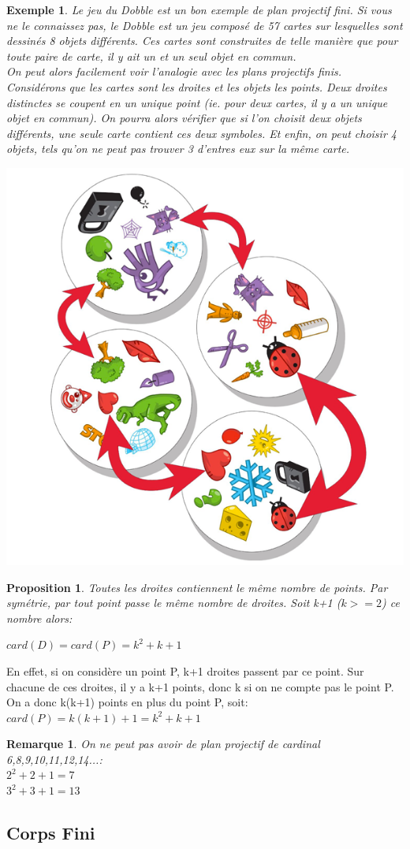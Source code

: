 \documentclass[a4paper]{article}
\newtheorem{Rem}{Remarque}[subsection]
\newtheorem{Ex}{Exemple}[subsection]
\newtheorem{Prop}{Proposition}
\begin{document}
\begin{Ex}
Le jeu du Dobble est un bon exemple de plan projectif fini. Si vous ne le connaissez pas, le Dobble est un jeu composé de 57 cartes sur lesquelles sont dessinés 8 objets différents. Ces cartes sont construites de telle manière que pour toute paire de carte, il y ait un et un seul objet en commun. \\
On peut alors facilement voir l'analogie avec les plans projectifs finis. Considérons que les cartes sont les droites et les objets les points. Deux droites distinctes se coupent en un unique point (ie. pour deux cartes, il y a un unique objet en commun). On pourra alors vérifier que si l'on choisit deux objets différents, une seule carte contient ces deux symboles. Et enfin, on peut choisir 4 objets, tels qu'on ne peut pas trouver 3 d'entres eux sur la même carte.
\begin{center}
\includegraphics[scale=0.3]{dobble-2.jpg}
\end{center}
\end{Ex}
\begin{Prop}
Toutes les droites contiennent le même nombre de points. Par symétrie, par tout point passe le même nombre de droites. Soit k+1 ($k>=2$) ce nombre alors:
\begin{center}
$card(D)=card(P)=k^2+k+1$
\end{center}
\end{Prop}
En effet, si on considère un point P, k+1 droites passent par ce point. Sur chacune de ces droites, il y a k+1 points, donc k si on ne compte pas le point P. On a donc k(k+1) points en plus du point P, soit:	$card(P)=k(k+1)+1=k^2+k+1$

\begin{Rem}
On ne peut pas avoir de plan projectif de cardinal 6,8,9,10,11,12,14...: \\
$2^2+2+1=7$ \\
$3^2+3+1=13$
\end{Rem}  
  
\subsection{Corps Fini}
  
  
  
  
  
\end{document}
